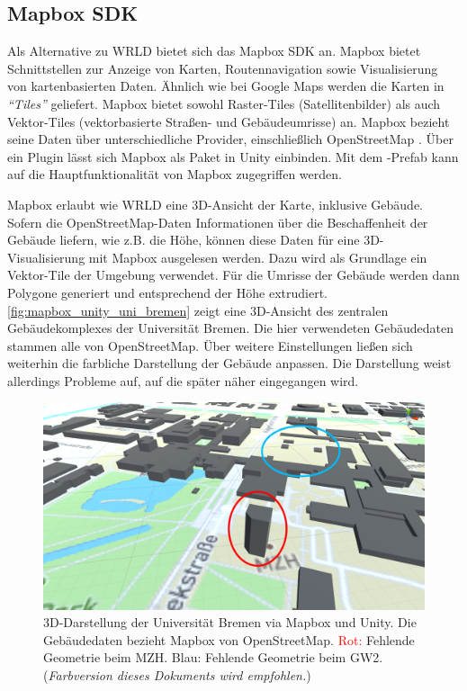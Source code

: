 \subsection{Mapbox SDK}
Als Alternative zu WRLD bietet sich das Mapbox SDK an.
Mapbox bietet Schnittstellen zur Anzeige von Karten, Routennavigation sowie Visualisierung von kartenbasierten Daten.
Ähnlich wie bei Google Maps werden die Karten in \emph{\enquote{Tiles}} geliefert.
Mapbox bietet sowohl Raster-Tiles (Satellitenbilder) als auch Vektor-Tiles (vektorbasierte Straßen- und Gebäudeumrisse) an.
Mapbox bezieht seine Daten über unterschiedliche Provider, einschließlich OpenStreetMap \autocite{Mapbox2018}.
Über ein Plugin lässt sich Mapbox als Paket in Unity einbinden.
Mit dem -Prefab kann auf die Hauptfunktionalität von Mapbox zugegriffen werden.

Mapbox erlaubt wie WRLD eine 3D-Ansicht der Karte, inklusive Gebäude.
Sofern die OpenStreetMap-Daten Informationen über die Beschaffenheit der Gebäude liefern, wie z.B. die Höhe, können diese Daten für eine 3D-Visualisierung mit Mapbox ausgelesen werden.
Dazu wird als Grundlage ein Vektor-Tile der Umgebung verwendet.
Für die Umrisse der Gebäude werden dann Polygone generiert und entsprechend der Höhe extrudiert.
\autoref{fig:mapbox_unity_uni_bremen} zeigt eine 3D-Ansicht des zentralen Gebäudekomplexes der Universität Bremen.
Die hier verwendeten Gebäudedaten stammen alle von OpenStreetMap.
Über weitere Einstellungen ließen sich weiterhin die farbliche Darstellung der Gebäude anpassen.
Die Darstellung weist allerdings Probleme auf, auf die später näher eingegangen wird.

\begin{figure}[t]
    \centering
    \includegraphics[width=\linewidth]{figures/mapbox_unity_uni_bremen_markings}
    \caption{3D-Darstellung der Universität Bremen via Mapbox und Unity. %
    Die Gebäudedaten bezieht Mapbox von OpenStreetMap. %
    \textcolor{red}{Rot:} Fehlende Geometrie beim MZH.\@ %
    \textcolor[HTML]{00bdff}{Blau:} Fehlende Geometrie beim GW2. %
    (\textit{Farbversion dieses Dokuments wird empfohlen.})}
    \label{fig:mapbox_unity_uni_bremen}
\end{figure}

